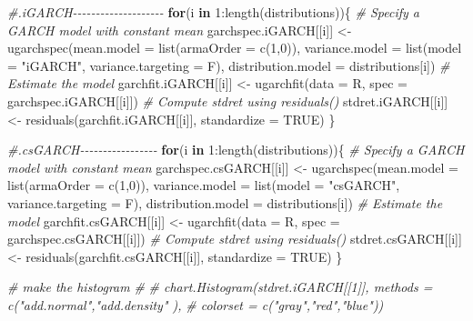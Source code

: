\documentclass[a4paper, twoside]{templates/ociamthesis}
\newenvironment{Shaded}{\begin{snugshade}}{\end{snugshade}}
\newcommand{\AttributeTok}[1]{\textcolor[rgb]{0.77,0.63,0.00}{#1}}
\newcommand{\CommentTok}[1]{\textcolor[rgb]{0.56,0.35,0.01}{\textit{#1}}}
\newcommand{\ConstantTok}[1]{\textcolor[rgb]{0.00,0.00,0.00}{#1}}
\newcommand{\ControlFlowTok}[1]{\textcolor[rgb]{0.13,0.29,0.53}{\textbf{#1}}}
\newcommand{\DecValTok}[1]{\textcolor[rgb]{0.00,0.00,0.81}{#1}}
\newcommand{\FunctionTok}[1]{\textcolor[rgb]{0.00,0.00,0.00}{#1}}
\newcommand{\NormalTok}[1]{#1}
\newcommand{\OtherTok}[1]{\textcolor[rgb]{0.56,0.35,0.01}{#1}}
\newcommand{\SpecialCharTok}[1]{\textcolor[rgb]{0.00,0.00,0.00}{#1}}
\newcommand{\StringTok}[1]{\textcolor[rgb]{0.31,0.60,0.02}{#1}}
\renewenvironment{Shaded}
{
  \vspace{10pt}%
  \begin{snugshade}%
}{%
  \end{snugshade}%
  \vspace{8pt}%
}
\begin{document}
\begin{Shaded}
\begin{Highlighting}[]
\CommentTok{\#.iGARCH{-}{-}{-}{-}{-}{-}{-}{-}{-}{-}{-}{-}{-}{-}{-}{-}{-}{-}{-}{-}}
\ControlFlowTok{for}\NormalTok{(i }\ControlFlowTok{in} \DecValTok{1}\SpecialCharTok{:}\FunctionTok{length}\NormalTok{(distributions))\{}
\CommentTok{\# Specify a GARCH model with constant mean}
\NormalTok{garchspec.iGARCH[[i]] }\OtherTok{\textless{}{-}} \FunctionTok{ugarchspec}\NormalTok{(}\AttributeTok{mean.model =} \FunctionTok{list}\NormalTok{(}\AttributeTok{armaOrder =} \FunctionTok{c}\NormalTok{(}\DecValTok{1}\NormalTok{,}\DecValTok{0}\NormalTok{)),}
                     \AttributeTok{variance.model =} \FunctionTok{list}\NormalTok{(}\AttributeTok{model =} \StringTok{"iGARCH"}\NormalTok{, }\AttributeTok{variance.targeting =}\NormalTok{ F), }
                     \AttributeTok{distribution.model =}\NormalTok{ distributions[i])}
\CommentTok{\# Estimate the model}
\NormalTok{garchfit.iGARCH[[i]] }\OtherTok{\textless{}{-}} \FunctionTok{ugarchfit}\NormalTok{(}\AttributeTok{data =}\NormalTok{ R, }\AttributeTok{spec =}\NormalTok{ garchspec.iGARCH[[i]])}
\CommentTok{\# Compute stdret using residuals()}
\NormalTok{stdret.iGARCH[[i]] }\OtherTok{\textless{}{-}} \FunctionTok{residuals}\NormalTok{(garchfit.iGARCH[[i]], }\AttributeTok{standardize =} \ConstantTok{TRUE}\NormalTok{)}
\NormalTok{\}}

\CommentTok{\#.csGARCH{-}{-}{-}{-}{-}{-}{-}{-}{-}{-}{-}{-}{-}{-}{-}{-}{-}}
\ControlFlowTok{for}\NormalTok{(i }\ControlFlowTok{in} \DecValTok{1}\SpecialCharTok{:}\FunctionTok{length}\NormalTok{(distributions))\{}
\CommentTok{\# Specify a GARCH model with constant mean}
\NormalTok{garchspec.csGARCH[[i]] }\OtherTok{\textless{}{-}} \FunctionTok{ugarchspec}\NormalTok{(}\AttributeTok{mean.model =} \FunctionTok{list}\NormalTok{(}\AttributeTok{armaOrder =} \FunctionTok{c}\NormalTok{(}\DecValTok{1}\NormalTok{,}\DecValTok{0}\NormalTok{)),}
                     \AttributeTok{variance.model =} \FunctionTok{list}\NormalTok{(}\AttributeTok{model =} \StringTok{"csGARCH"}\NormalTok{, }\AttributeTok{variance.targeting =}\NormalTok{ F), }
                     \AttributeTok{distribution.model =}\NormalTok{ distributions[i])}
\CommentTok{\# Estimate the model}
\NormalTok{garchfit.csGARCH[[i]] }\OtherTok{\textless{}{-}} \FunctionTok{ugarchfit}\NormalTok{(}\AttributeTok{data =}\NormalTok{ R, }\AttributeTok{spec =}\NormalTok{ garchspec.csGARCH[[i]])}
\CommentTok{\# Compute stdret using residuals()}
\NormalTok{stdret.csGARCH[[i]] }\OtherTok{\textless{}{-}} \FunctionTok{residuals}\NormalTok{(garchfit.csGARCH[[i]], }\AttributeTok{standardize =} \ConstantTok{TRUE}\NormalTok{)}
\NormalTok{\}}

\CommentTok{\#  make the histogram}
\CommentTok{\# }
\CommentTok{\# chart.Histogram(stdret.iGARCH[[1]], methods = c("add.normal","add.density" ),}
\CommentTok{\#                 colorset = c("gray","red","blue"))}
\end{Highlighting}
\end{Shaded}
\end{document}
